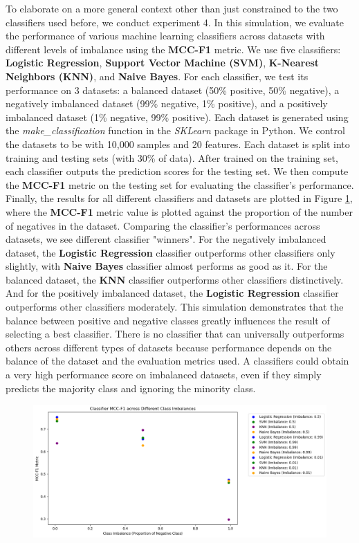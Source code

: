 \documentclass[12pt, oneside]{amsart}
\theoremstyle{definition}
\theoremstyle{remark}
\numberwithin{equation}{section}
\begin{document}
To elaborate on a more general context other than just constrained to the two classifiers used before, we conduct experiment 4. In this simulation, we evaluate the performance of various machine learning classifiers across datasets with different levels of imbalance using the \textbf{MCC-F1} metric. We use five classifiers: \textbf{Logistic Regression}, \textbf{Support Vector Machine (SVM)}, \textbf{K-Nearest Neighbors (KNN)}, and \textbf{Naive Bayes}. For each classifier, we test its performance on 3 datasets: a balanced dataset (50\% positive, 50\% negative), a negatively imbalanced dataset (99\% negative, 1\% positive), and a positively imbalanced dataset (1\% negative, 99\% positive). Each dataset is generated using the \textit{make\_classification} function in the \textit{SKLearn} package in Python. We control the datasets to be with 10,000 samples and 20 features. Each dataset is split into training and testing sets (with 30\% of data). After trained on the training set, each classifier outputs the prediction scores for the testing set. We then compute the \textbf{MCC-F1} metric on the testing set for evaluating the classifier's performance.\\

Finally, the results for all different classifiers and datasets are plotted in Figure \ref{simulation4}, where the \textbf{MCC-F1} metric value is plotted against the proportion of the number of negatives in the dataset. Comparing the classifier's performances across datasets, we see different classifier "winners". For the negatively imbalanced dataset, the \textbf{Logistic Regression} classifier outperforms other classifiers only slightly, with \textbf{Naive Bayes} classifier almost performs as good as it. For the balanced dataset, the \textbf{KNN} classifier outperforms other classifiers distinctively. And for the positively imbalanced dataset, the \textbf{Logistic Regression} classifier outperforms other classifiers moderately. This simulation demonstrates that the balance between positive and negative classes greatly influences the result of selecting a best classifier. There is no classifier that can universally outperforms others across different types of datasets because performance depends on the balance of the dataset and the evaluation metrics used. A classifiers could obtain a very high performance score on imbalanced datasets, even if they simply predicts the majority class and ignoring the minority class. 
\begin{figure}[hbt!]
    \centering
    \includegraphics[scale=0.4]{Report/Figure/simulation4.jpg}
    \caption{}
    \label{simulation4}
\end{figure}
\FloatBarrier
\end{document}

